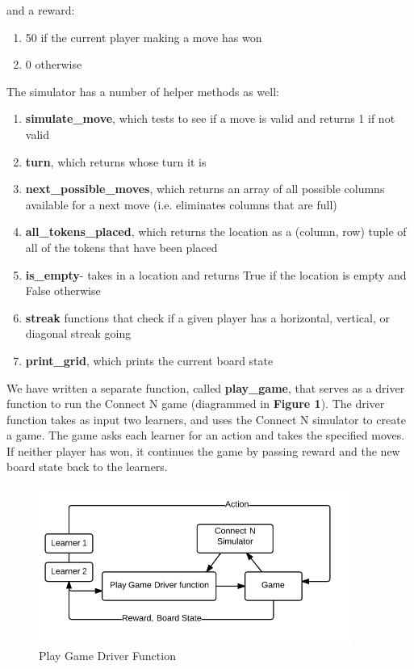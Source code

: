 \documentclass[12pt]{article}
\begin{document}
and a reward:
\begin{enumerate}
\item 50 if the current player making a move has won
\item 0 otherwise
\end{enumerate}

The simulator has a number of helper methods as well:
\begin{enumerate}
\item \textbf{simulate\_move}, which tests to see if a move is valid and returns 1 if not valid
\item \textbf{turn}, which returns whose turn it is 
\item \textbf{next\_possible\_moves}, which returns an array of all possible columns available for a next move (i.e. eliminates columns that are full)
\item \textbf{all\_tokens\_placed}, which returns the location as a (column, row) tuple of all of the tokens that have been placed					
\item \textbf{is\_empty}- takes in a location and returns True if the location is empty and False otherwise
\item \textbf{streak} functions that check if a given player has a horizontal, vertical, or diagonal streak going
\item \textbf{print\_grid}, which prints the current board state
\end{enumerate}

We have written a separate function, called \textbf{play\_game}, that serves as a driver function to run the Connect N game (diagrammed in \textbf{Figure 1}).  The driver function takes as input two learners, and uses the Connect N simulator to create a game. The game asks each learner for an action and takes the specified moves. If neither player has won, it continues the game by passing reward and the new board state back to the learners.

\begin{figure}
\centering
\includegraphics[scale=.7]{game_process.png}
\caption{Play Game Driver Function}
\end{figure}
\end{document}
